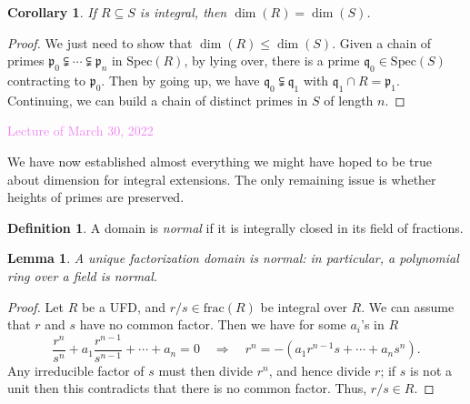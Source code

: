 \documentclass{amsart}[12pt]
\newcommand{\Mar}[1]{\textcolor{violet}{Lecture of March #1, 2022}}
\newcommand{\p}{{\mathfrak p}}
\newcommand{\q}{{\mathfrak q}}
\numberwithin{equation}{section}
\theoremstyle{plain} %
\newtheorem{corollary}[equation]{Corollary}
\newtheorem{lemma}[equation]{Lemma}
\theoremstyle{definition}
\newtheorem{definition}[equation]{Definition}
\theoremstyle{remark}
\newcommand{\Spec}{\mathrm{Spec}}
\begin{document}
\begin{corollary}
	If $R\subseteq S$ is integral, then $\dim(R)=\dim(S)$.
\end{corollary}
\begin{proof}
	We just need to show that $\dim(R)\leq \dim(S)$. Given a chain of primes $\p_0 \subsetneqq \cdots \subsetneqq \p_n$ in $\Spec(R)$, by lying over, there is a prime $\q_0 \in \Spec(S)$ contracting to $\p_0$. Then by going up, we have $\q_0 \subsetneqq \q_1$ with $\q_1 \cap R = \p_1$. Continuing, we can build a chain of distinct primes in $S$ of length $n$.
\end{proof}

\Mar{30}

We have now established almost everything we might have hoped to be true about dimension for integral extensions. The only remaining issue is whether heights of primes are preserved. 

\begin{definition}
	A domain is \emph{normal} if it is integrally closed in its field of fractions.
\end{definition}

\begin{lemma}
	A unique factorization domain is normal: in particular, a polynomial ring over a field is normal.
\end{lemma}
\begin{proof}
	Let $R$ be a UFD, and $r/s\in \mathrm{frac}(R)$ be integral over $R$. We can assume that $r$ and $s$ have no common factor. Then we have for some $a_i$'s in $R$
	\[ \frac{r^n}{s^n} + a_1  \frac{r^{n-1}}{s^{n-1}} + \cdots  + a_n = 0 \quad \Rightarrow \quad r^n = -( a_1 r^{n-1} s + \cdots + a_n s^n ).\]
	Any irreducible factor of $s$ must then divide $r^n$, and hence divide $r$; if $s$ is not a unit then this contradicts that there is no common factor. Thus, $r/s\in R$.
\end{proof}
\end{document}
